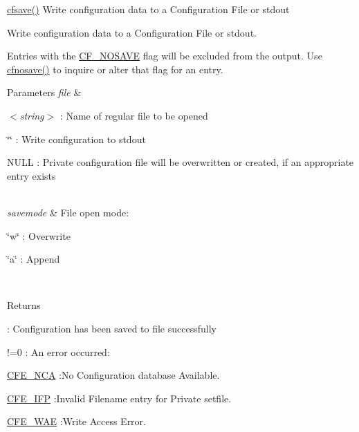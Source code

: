 \hyperlink{group__setting__saving_gaad7e1267cd904b4480a0eeaeb03b5f75}{cfsave()} Write configuration data to a Configuration File or {\ttfamily stdout} 

Write configuration data to a Configuration File or {\ttfamily stdout}.

Entries with the \hyperlink{group__special__options__mask_gad76153c65f68cc0ee5c1a04c8c3e80bf}{C\-F\-\_\-\-N\-O\-S\-A\-V\-E} flag will be excluded from the output. Use \hyperlink{group__setting__saving_ga0f6ed90e3ecfa0074af1635a0e4339ef}{cfnosave()} to inquire or alter that flag for an entry.


\begin{DoxyParams}{Parameters}
{\em file} & \begin{DoxyItemize}
\item $<${\itshape string$>$\/} \-: Name of regular file to be opened \item {\ttfamily \char`\"{}\char`\"{}} \-: Write configuration to {\ttfamily stdout} \item {\ttfamily N\-U\-L\-L} \-: Private configuration file will be overwritten or created, if an appropriate entry exists\end{DoxyItemize}
\\
\hline
{\em savemode} & File open mode\-: \begin{DoxyItemize}
\item {\ttfamily \char`\"{}w\char`\"{}} \-: Overwrite \item {\ttfamily \char`\"{}a\char`\"{}} \-: Append\end{DoxyItemize}
\\
\hline
\end{DoxyParams}
\begin{DoxyReturn}{Returns}
\begin{DoxyItemize}
\item {} \-: Configuration has been saved to file successfully \item {\ttfamily !=0} \-: An error occurred\-:
\begin{DoxyItemize}
\item \hyperlink{group__errors_gaf8cd36471ddcc549668f49238855609d}{C\-F\-E\-\_\-\-N\-C\-A} \-:No Configuration database Available.  
\item \hyperlink{group__errors_ga939964b690f63b5484ec40fe8a4a7c56}{C\-F\-E\-\_\-\-I\-F\-P} \-:Invalid Filename entry for Private setfile.  
\item \hyperlink{group__errors_gad1375fe531ed1c13233e2fa7ae55534f}{C\-F\-E\-\_\-\-W\-A\-E} \-:Write Access Error.   
\end{DoxyItemize}\end{DoxyItemize}

\end{DoxyReturn}
